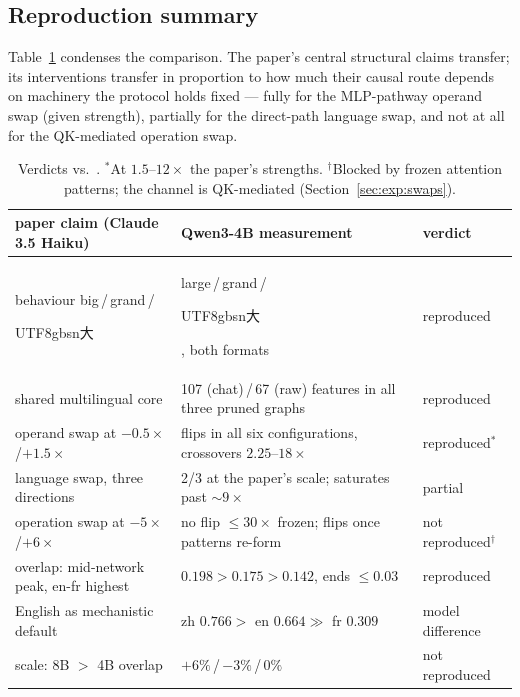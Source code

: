 \documentclass[11pt,a4paper]{article}
\newcommand{\zh}[1]{\begin{CJK}{UTF8}{gbsn}#1\end{CJK}}
\begin{document}
\subsection{Reproduction summary}\label{sec:exp:verdicts}

Table~\ref{tab:verdicts} condenses the comparison. The paper's central structural
claims transfer; its interventions transfer in proportion to how much their causal
route depends on machinery the protocol holds fixed --- fully for the MLP-pathway
operand swap (given strength), partially for the direct-path language swap, and not at
all for the QK-mediated operation swap.

\begin{table}[t]
\centering\small
\begin{tabular}{p{5.3cm}p{6.4cm}l}
\toprule
paper claim (Claude 3.5 Haiku) & Qwen3-4B measurement & verdict \\
\midrule
behaviour big\,/\,grand\,/\,\zh{大} & large\,/\,grand\,/\,\zh{大}, both formats & reproduced \\
shared multilingual core & 107 (chat)\,/\,67 (raw) features in all three pruned graphs & reproduced \\
operand swap at $-0.5\times$/$+1.5\times$ & flips in all six configurations, crossovers $2.25$--$18\times$ & reproduced$^{*}$ \\
language swap, three directions & 2/3 at the paper's scale; saturates past ${\sim}9\times$ & partial \\
operation swap at $-5\times$/$+6\times$ & no flip $\le 30\times$ frozen; flips once patterns re-form & not reproduced$^{\dagger}$ \\
overlap: mid-network peak, en-fr highest & $0.198 > 0.175 > 0.142$, ends $\le 0.03$ & reproduced \\
English as mechanistic default & zh $0.766 >$ en $0.664 \gg$ fr $0.309$ & model difference \\
scale: 8B $>$ 4B overlap & $+6\%$\,/\,$-3\%$\,/\,$0\%$ & not reproduced \\
\bottomrule
\end{tabular}
\caption{Verdicts vs.\ \citet{lindsey2025biology}. $^{*}$At $1.5$--$12\times$ the
paper's strengths. $^{\dagger}$Blocked by frozen attention patterns; the channel is
QK-mediated (Section~\ref{sec:exp:swaps}).}
\label{tab:verdicts}
\end{table}

\FloatBarrier

\end{document}
